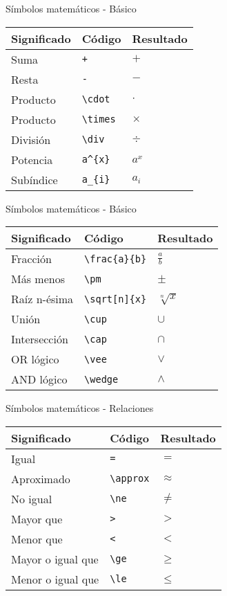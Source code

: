 \documentclass[ignorenonframetext,]{beamer}
\begin{document}
\begin{frame}[fragile]{Símbolos matemáticos - Básico}
\protect\hypertarget{simbolos-matematicos---basico}{}

\begin{longtable}[]{@{}lll@{}}
\toprule
Significado & Código & Resultado\tabularnewline
\midrule
\endhead
Suma & \texttt{+} & \(+\)\tabularnewline
Resta & \texttt{-} & \(-\)\tabularnewline
Producto & \texttt{\textbackslash{}cdot} & \(\cdot\)\tabularnewline
Producto & \texttt{\textbackslash{}times} & \(\times\)\tabularnewline
División & \texttt{\textbackslash{}div} & \(\div\)\tabularnewline
Potencia & \texttt{a\^{}\{x\}} & \(a^{x}\)\tabularnewline
Subíndice & \texttt{a\_\{i\}} & \(a_{i}\)\tabularnewline
\bottomrule
\end{longtable}

\end{frame}

\begin{frame}[fragile]{Símbolos matemáticos - Básico}
\protect\hypertarget{simbolos-matematicos---basico-1}{}

\begin{longtable}[]{@{}lll@{}}
\toprule
Significado & Código & Resultado\tabularnewline
\midrule
\endhead
Fracción & \texttt{\textbackslash{}frac\{a\}\{b\}} &
\(\frac{a}{b}\)\tabularnewline
Más menos & \texttt{\textbackslash{}pm} & \(\pm\)\tabularnewline
Raíz n-ésima & \texttt{\textbackslash{}sqrt{[}n{]}\{x\}} &
\(\sqrt[n]{x}\)\tabularnewline
Unión & \texttt{\textbackslash{}cup} & \(\cup\)\tabularnewline
Intersección & \texttt{\textbackslash{}cap} & \(\cap\)\tabularnewline
OR lógico & \texttt{\textbackslash{}vee} & \(\vee\)\tabularnewline
AND lógico & \texttt{\textbackslash{}wedge} & \(\wedge\)\tabularnewline
\bottomrule
\end{longtable}

\end{frame}

\begin{frame}[fragile]{Símbolos matemáticos - Relaciones}
\protect\hypertarget{simbolos-matematicos---relaciones}{}

\begin{longtable}[]{@{}lll@{}}
\toprule
Significado & Código & Resultado\tabularnewline
\midrule
\endhead
Igual & \texttt{=} & \(=\)\tabularnewline
Aproximado & \texttt{\textbackslash{}approx} &
\(\approx\)\tabularnewline
No igual & \texttt{\textbackslash{}ne} & \(\ne\)\tabularnewline
Mayor que & \texttt{\textgreater{}} & \(>\)\tabularnewline
Menor que & \texttt{\textless{}} & \(<\)\tabularnewline
Mayor o igual que & \texttt{\textbackslash{}ge} & \(\ge\)\tabularnewline
Menor o igual que & \texttt{\textbackslash{}le} & \(\le\)\tabularnewline
\bottomrule
\end{longtable}

\end{frame}
\end{document}
